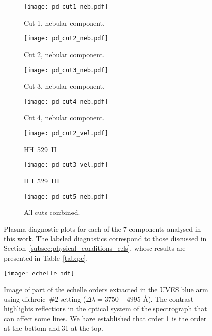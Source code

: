 \documentclass[fleqn,usenatbib]{mnras}
\begin{document}
\begin{figure*}
  \begin{subfigure}{7.5cm}
    \centering\texttt{[image: pd\_cut1\_neb.pdf]}
    \caption{Cut 1, nebular component.}
  \end{subfigure}
  \begin{subfigure}{7.5cm}
    \centering\texttt{[image: pd\_cut2\_neb.pdf]}
    \caption{Cut 2, nebular component.}
  \end{subfigure}
 
  \begin{subfigure}{7.5cm}
    \centering\texttt{[image: pd\_cut3\_neb.pdf]}
    \caption{Cut 3, nebular component.}
  \end{subfigure}
  \begin{subfigure}{7.5cm}
    \centering\texttt{[image: pd\_cut4\_neb.pdf]}
    \caption{Cut 4, nebular component.}
  \end{subfigure}

  \begin{subfigure}{7.5cm}
    \centering\texttt{[image: pd\_cut2\_vel.pdf]}
    \caption{HH~529~II}
  \end{subfigure}
  \begin{subfigure}{7.5cm}
    \centering\texttt{[image: pd\_cut3\_vel.pdf]}
    \caption{HH~529~III}
  \end{subfigure}

  \begin{subfigure}{12cm}
    \centering\texttt{[image: pd\_cut5\_neb.pdf]}
    \caption{All cuts combined.}
  \end{subfigure}
  \caption{Plasma diagnostic plots for each of the 7 components analysed in this work. The labeled diagnostics correspond to those discussed in Section~\ref{subsec:physical_conditions_cels}, whose results are presented in Table~\ref{tab:pc}.}
\label{fig:plasma}
\end{figure*}



\begin{figure}
\texttt{[image: echelle.pdf]}
\caption{Image of part of the echelle orders extracted in the UVES blue arm using dichroic~\#2 setting ($\Delta \lambda=3750-4995$ \AA). The contrast highlights reflections in the optical system of the spectrograph that can affect some lines. We have established that order 1 is the order at the bottom and 31 at the top.}
\label{fig:echelle}
\end{figure}
\end{document}

